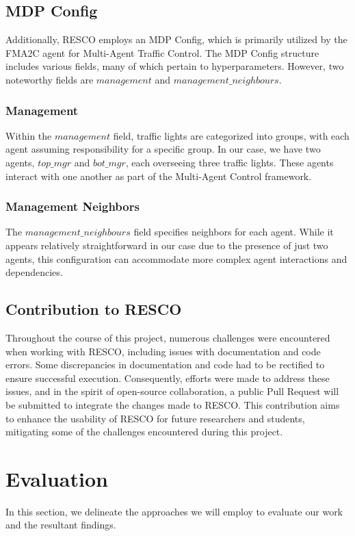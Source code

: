 \newpage
\subsection{MDP Config}
Additionally, RESCO employs an MDP Config, which is primarily utilized by the FMA2C agent for Multi-Agent Traffic Control. The MDP Config structure includes various fields, many of which pertain to hyperparameters. However, two noteworthy fields are $management$ and $management\_neighbours$.

\subsubsection{Management}
Within the $management$ field, traffic lights are categorized into groups, with each agent assuming responsibility for a specific group. In our case, we have two agents, $top\_mgr$ and $bot\_mgr$, each overseeing three traffic lights. These agents interact with one another as part of the Multi-Agent Control framework.

\subsubsection{Management Neighbors}
The $management\_neighbours$ field specifies neighbors for each agent. While it appears relatively straightforward in our case due to the presence of just two agents, this configuration can accommodate more complex agent interactions and dependencies.

\subsection{Contribution to RESCO}
Throughout the course of this project, numerous challenges were encountered when working with RESCO, including issues with documentation and code errors. Some discrepancies in documentation and code had to be rectified to ensure successful execution. Consequently, efforts were made to address these issues, and in the spirit of open-source collaboration, a public Pull Request will be submitted to integrate the changes made to RESCO. This contribution aims to enhance the usability of RESCO for future researchers and students, mitigating some of the challenges encountered during this project.

\section{Evaluation}
In this section, we delineate the approaches we will employ to evaluate our work and the resultant findings.

